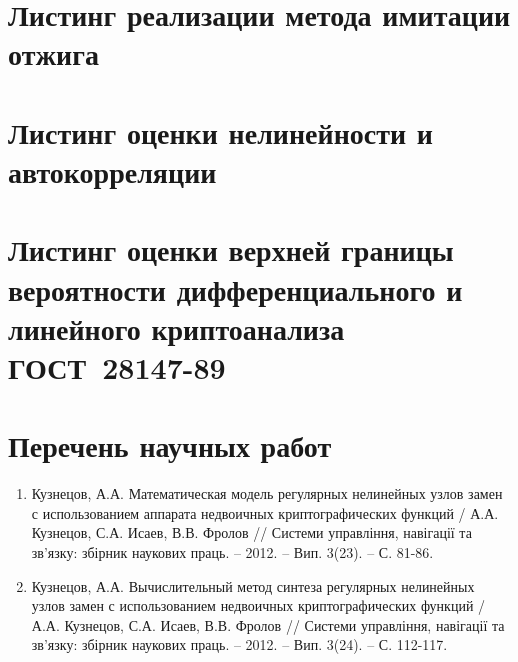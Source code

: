\appendix


\chapter{Листинг реализации метода имитации отжига}
\label{app:listing_simulated_annealing}



\chapter{Листинг оценки нелинейности и автокорреляции}
\label{app:listing_NL_AC}



\chapter{Листинг оценки верхней границы вероятности дифференциального и линейного криптоанализа ГОСТ~28147-89}
\label{app:listing_MD_ML}



\chapter{Перечень научных работ}
\label{app:list_of_papers}
    
\begin{enumerate}
    
    \item Кузнецов, А.А. Математическая модель регулярных нелинейных узлов замен с использованием аппарата недвоичных криптографических функций / А.А. Кузнецов, С.А. Исаев, В.В. Фролов // Системи управління, навігації та зв’язку: збірник наукових праць. -- 2012. -- Вип. 3(23). -- С. 81-86.
    
    \item Кузнецов, А.А. Вычислительный метод синтеза регулярных нелинейных узлов замен с использованием недвоичных криптографических функций / А.А. Кузнецов, С.А. Исаев, В.В. Фролов // Системи управління, навігації та зв’язку: збірник наукових праць. -- 2012. -- Вип. 3(24). -- С. 112-117.

\end{enumerate}
